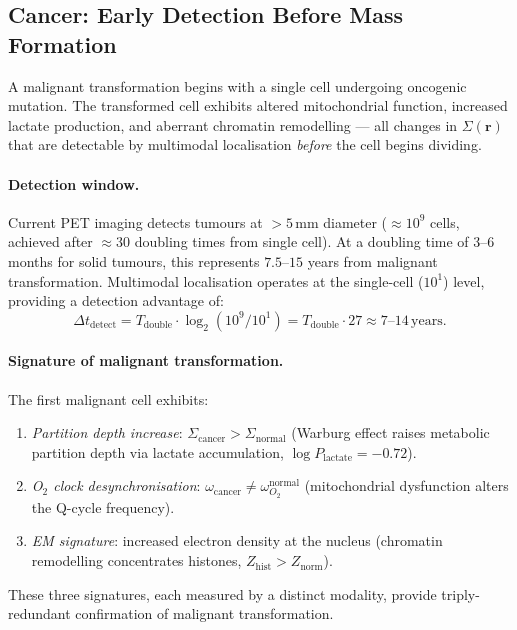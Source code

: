 \subsection{Cancer: Early Detection Before Mass Formation}
\label{sec:ch06-cancer-early-detection}

A malignant transformation begins with a single cell undergoing oncogenic
mutation.  The transformed cell exhibits altered mitochondrial function,
increased lactate production, and aberrant chromatin remodelling --- all
changes in $\Sigma(\mathbf{r})$ that are detectable by multimodal localisation
\emph{before} the cell begins dividing.

\paragraph{Detection window.}
Current PET imaging detects tumours at $>5\,\text{mm}$ diameter ($\approx
10^9$ cells, achieved after $\approx 30$ doubling times from single cell).
At a doubling time of 3--6 months for solid tumours, this represents $7.5$--$15$
years from malignant transformation.  Multimodal localisation operates at
the single-cell ($10^1$) level, providing a detection advantage of:
\[
  \Delta t_\text{detect} = T_\text{double} \cdot \log_2(10^9 / 10^1)
  = T_\text{double} \cdot 27 \approx 7\text{--}14\,\text{years}.
\]

\paragraph{Signature of malignant transformation.}
The first malignant cell exhibits:
\begin{enumerate}[label=(\arabic*),leftmargin=2em]
  \item \emph{Partition depth increase}: $\Sigma_\text{cancer} >
    \Sigma_\text{normal}$ (Warburg effect raises metabolic partition depth
    via lactate accumulation, $\log P_\text{lactate} = -0.72$).
  \item \emph{O$_2$ clock desynchronisation}: $\omega_\text{cancer} \ne
    \omega_{O_2}^\text{normal}$ (mitochondrial dysfunction alters the Q-cycle
    frequency).
  \item \emph{EM signature}: increased electron density at the nucleus
    (chromatin remodelling concentrates histones, $Z_\text{hist} > Z_\text{norm}$).
\end{enumerate}
These three signatures, each measured by a distinct modality, provide
triply-redundant confirmation of malignant transformation.

